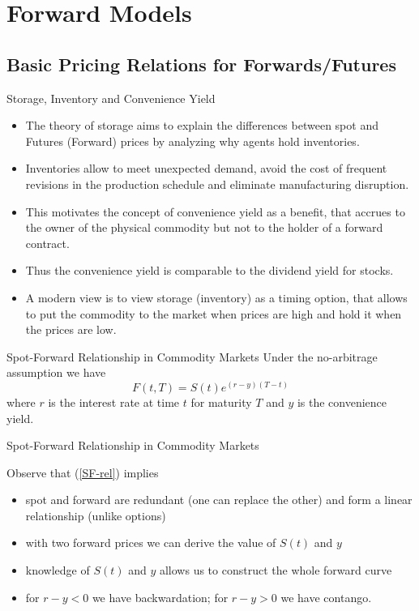 \section{Forward Models}
\subsection{Basic Pricing Relations for Forwards/Futures}

{Storage, Inventory and Convenience Yield}
\begin{itemize}
\item<1-> The theory of storage aims to explain the differences between spot
and Futures (Forward) prices by analyzing why agents hold inventories.
\item<2-> Inventories
allow to meet unexpected demand, avoid the cost of frequent revisions in
the production schedule and eliminate manufacturing disruption.
\item<3-> This
motivates the concept of convenience yield as a benefit, that accrues to the
owner of the physical commodity but not to the holder of a forward contract.
\item<4-> Thus the convenience yield is comparable to the dividend yield for stocks.
\item<5-> A modern view is to view storage (inventory) as a timing option, that
allows to put the commodity to the market when prices are high
and hold it when the prices are low.
\end{itemize}



{Spot-Forward Relationship in Commodity Markets }
Under the no-arbitrage assumption we have
\begin{equation}\label{SF-rel}
F(t,T)=S(t)e^{(r-y)(T-t)}
\end{equation}
where $r$ is the interest rate at time $t$ for maturity $T$ and $y$ is the convenience yield.





{Spot-Forward Relationship in Commodity Markets }


Observe that (\ref{SF-rel}) implies
\begin{itemize}
\item<1-> spot and forward are redundant (one can replace the other) and form a
linear relationship (unlike options)
\item<2-> with two forward prices we can derive the value of $S(t)$ and $y$
\item<3-> knowledge of $S(t)$ and $y$ allows us to construct the whole forward curve
\item<4-> for $r-y <0$ we have backwardation; for $r-y>0$ we have contango.
\end{itemize}





